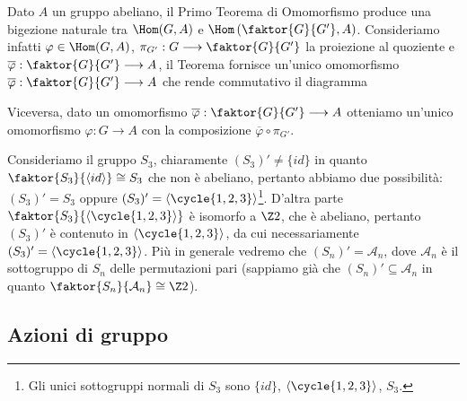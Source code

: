 \documentclass[11pt]{scrartcl}
\begin{document}
\begin{remark}
    Dato $A$ un gruppo abeliano, il Primo Teorema di Omomorfismo produce una bigezione naturale tra 
    $\Hom(G, A)$ e $\Hom\left(\faktor{G}{G'}, A\right)$. Consideriamo infatti $\varphi \in \Hom(G, A)$,
    $\pi_{G'}: G \longrightarrow \faktor{G}{G'}$ la proiezione al quoziente e 
    $\overline{\varphi} : \faktor{G}{G'}\longrightarrow A$, il Teorema
    fornisce un'unico omomorfismo $\overline{\varphi}: \faktor{G}{G'}\longrightarrow A$
    che rende commutativo il diagramma
    \begin{center}
    \end{center}
    Viceversa, dato un omomorfismo $\overline{\varphi}:\faktor{G}{G'}\longrightarrow A$
    otteniamo un'unico omomorfismo $\varphi:G\longrightarrow A$ con la 
    composizione $\overline{\varphi}\circ\pi_{G'}$.
\end{remark}

\begin{example}
    Consideriamo il gruppo $S_3$, chiaramente $(S_3)' \neq \{id\}$ in quanto
    $\faktor{S_3}{\langle id\rangle} \cong S_3$ che non è abeliano, pertanto 
    abbiamo due possibilità: $(S_3)' = S_3$ oppure $(S_3)' = \langle\cycle{1, 2, 3}\rangle$\footnote{
        Gli unici sottogruppi normali di $S_3$ sono $\{id\}$, 
        $\langle\cycle{1, 2, 3}\rangle$, $S_3$.}. D'altra parte 
        $\faktor{S_3}{\langle\cycle{1, 2, 3}\rangle}$ è isomorfo a $\Z2$, che
        è abeliano, pertanto $(S_3)'$ è contenuto in $\langle\cycle{1, 2, 3}\rangle$,
        da cui necessariamente $(S_3)' = \langle\cycle{1, 2, 3}\rangle$.
        Più in generale vedremo che $(S_n)' = \mathcal{A}_n$, dove $\mathcal{A}_n$ è il sottogruppo
        di $S_n$ delle permutazioni pari (sappiamo già che $(S_n)' \subseteq
        \mathcal{A}_n$ in quanto $\faktor{S_n}{\mathcal{A}_n}\cong\Z2$).
\end{example}

\newpage

\subsection{Azioni di gruppo}
\end{document}
